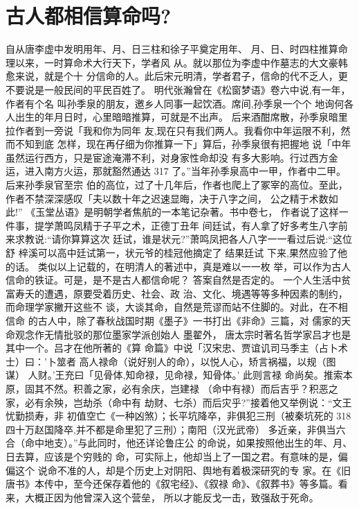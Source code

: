 \section{古人都相信算命吗?}
自从唐李虚中发明用年、月、日三柱和徐子平奠定用年、
月、日、时四柱推算命理以来，一时算命术大行天下，学者风
从。就以那位为李虚中作墓志的大文豪韩愈来说，就是个十
分信命的人。此后宋元明清，学者君子，信命的代不乏人，更
不要说是一般民间的平民百姓了。
明代张瀚曾在《松窗梦语》卷六中说,有一年，作者有个名
叫孙季泉的朋友，邀乡人同事一起饮酒。席间,孙季泉一个个
地询何各人出生的年月日时，心里暗暗推算，可就是不出声。
后来酒酣席散，孙季泉暗里拉作者到一旁说「我和你为同年
友,现在只有我们两人。我看你中年运限不利，然而不知到底
怎样，现在再仔细为你推算一下」算后，孙季泉很有把握地
说「中年虽然运行西方，只是宦途淹滞不利，对身家性命却没
有多大影响。行过西方金运，进入南方火运，那就豁然通达
317
了。”当年孙季泉高中一甲，作者中二甲。后来孙季泉官至宗
伯的高位，过了十几年后，作者也爬上了冢宰的高位。至此，
作者不禁深深感叹「夫以数十年之迟速显晦，决于八字之间，
公之精于术数如此!”
《玉堂丛语》是明朝学者焦航的一本笔记杂著。书中卷七，
作者说了这样一件事，提学萧鸣凤精于子平之术，正德丁丑年
间廷试，有人拿了好多考生八字前来求教说:“请你算算这次
廷试，谁是状元?”萧鸣凤把各人八字一一看过后说:“这位舒
梓溪可以高中廷试第一，状元爷的桂冠他摘定了 结果廷试
下来,果然应验了他的话。
类似以上记载的，在明清人的著述中，真是难以一一枚
举，可以作为古人信命的铁证。可是，是不是古人都信命呢？
答案自然是否定的。
一个人生活中贫富寿夭的遭遇，原要受着历史、社会、政
治、文化、境遇等等多种因素的制约，而命理学家撇开这些不
谈，大谈其命，自然是荒谬而站不住脚的。对此，在不相信命
的古人中，除了春秋战国时期《墨子》一书打出《非命》三篇，对
儒家的天命观念作无情批驳的那位墨家学派创始人 墨翟外，
唐太宗时著名哲学家吕才也是其中一个。吕才在他所著的《算
命篇》中说「汉宋忠、贾谊讥司马季主（占卜术士）曰：'卜筮者
高人禄命（说好别人的命），以悦人心，矫言祸福，以规（图谋）
人财。'王充曰「见骨体,知命禄，见命禄，知骨体。' 此则言禄
命尚矣。推索本原，固其不然。积善之家，必有余庆，岂建禄
（命中有禄）而后吉乎？积恶之家，必有余殃，岂劫杀（命中有
劫财、七杀）而后灾乎?”接着他又举例说：“文王忧勤损寿，非
初值空亡《一种凶煞）；长平坑降卒，非俱犯三刑（被秦坑死的
318 
四十万赵国降卒,并不都是命里犯了三刑）；南阳（汉光武帝）
多近亲，非俱当六合（命中地支）。”与此同时，他还详论鲁庄公
的命说，如果按照他出生的年、月、日去算，应该是个穷贱的
命，可实际上，他却当上了一国之君。有意味的是，偏偏这个
说命不准的人，却是个历史上对阴阳、舆地有着极深研究的专
家。在《旧唐书》本传中，至今还保存着他的《叙宅经》、《叙禄
命》、《叙葬书》等多篇。看来，大概正因为他曾深入这个营垒，
所以才能反戈一击，致强敌于死命。
